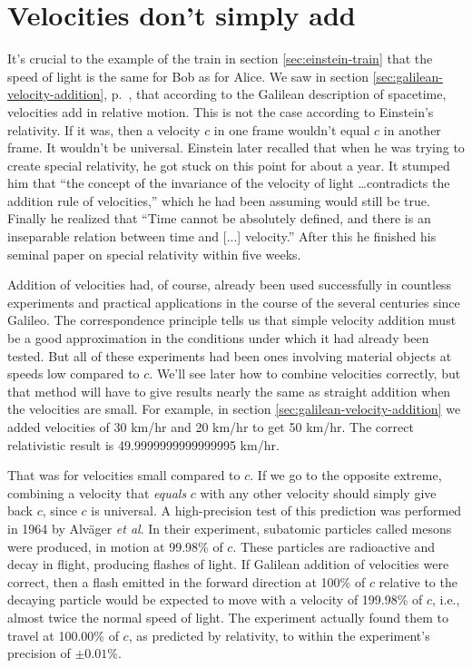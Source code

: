 \section{Velocities don't simply add}\label{sec:velocities-do-not-add}

It's crucial to the example of the train
in section \ref{sec:einstein-train} that the speed of light is the same for Bob as for Alice.
We saw in section \ref{sec:galilean-velocity-addition}, p.~\pageref{sec:galilean-velocity-addition},
that according to the Galilean description of spacetime, velocities add in relative motion.
This is not the case according to Einstein's relativity.
If it was, then a velocity $c$ in one frame wouldn't equal $c$ in another frame.
It wouldn't be universal. 
Einstein later recalled that when he was trying to create special relativity, he got stuck on
this point for about a year.
It stumped him that ``the concept of the invariance
of the velocity of light \ldots contradicts the addition rule of velocities,'' which he had been assuming
would still be true. Finally he realized that ``Time cannot be absolutely defined, and there is
an inseparable relation between time and [...] velocity.'' After this he finished his seminal paper
on special relativity within five weeks.

Addition of velocities had, of course, already been used
successfully in countless experiments and practical applications in the course of the several
centuries since Galileo. The correspondence principle tells us that simple velocity addition
must be a good approximation in the conditions under which it had already been tested.
But all of these experiments had been ones involving material objects at speeds low compared
to $c$. We'll see later how to combine velocities correctly, but that method will have to give
results nearly the same as straight addition when the velocities are small. For example,
in section \ref{sec:galilean-velocity-addition} we added velocities of 30 km/hr and 20 km/hr
to get 50 km/hr. The correct relativistic result is 49.9999999999999995 km/hr.

That was for velocities small compared to $c$. If we go to the opposite extreme, combining
a velocity that \emph{equals} $c$ with any other velocity should simply give back $c$, since
$c$ is universal. A high-precision test of this prediction was performed in 1964 by Alv\"ager
\emph{et al}. In their experiment, subatomic particles called mesons were produced, in motion at
99.98\% of $c$.
These particles are radioactive and decay in flight, producing flashes of light. If Galilean
addition of velocities were correct, then a flash emitted in the forward direction
at 100\% of $c$ relative to the decaying particle would be expected to move with a velocity
of 199.98\% of $c$, i.e., almost twice the normal speed of light. The experiment actually
found them to travel at 100.00\% of $c$, as predicted by relativity, to within the experiment's
precision of $\pm0.01$\%.

